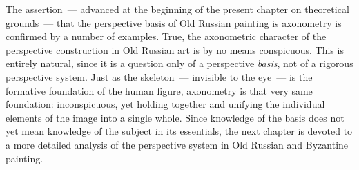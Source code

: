 
The assertion~--- advanced at the beginning of the present chapter on theoretical
grounds~--- that the perspective basis of Old Russian painting is axonometry is
confirmed by a number of examples.  True, the axonometric character of the perspective
construction in Old Russian art is by no means conspicuous.  This is entirely natural,
since it is a question only of a perspective \emph{basis}, not of a rigorous perspective
system.  Just as the skeleton~--- invisible to the eye~--- is the formative foundation of
the human figure, axonometry is that very same foundation: inconspicuous, yet holding
together and unifying the individual elements of the image into a single whole.  Since
knowledge of the basis does not yet mean knowledge of the subject in its essentials,
the next chapter is devoted to a more detailed analysis of the perspective system in Old
Russian and Byzantine painting.
